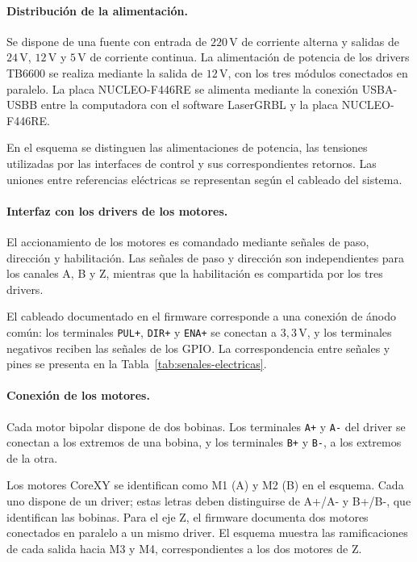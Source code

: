 \documentclass[blue,fullpaper]{ludusofficial}  %
\begin{document}
\paragraph{Distribución de la alimentación.}
Se dispone de una fuente con entrada de
$220\,\mathrm{V}$ de corriente alterna y salidas de
$24\,\mathrm{V}$, $12\,\mathrm{V}$ y $5\,\mathrm{V}$ de corriente continua.
La alimentación de potencia de los drivers TB6600
se realiza mediante la salida de $12\,\mathrm{V}$,
con los tres módulos conectados en paralelo.
La placa NUCLEO-F446RE se alimenta mediante
la conexión USBA-USBB entre la computadora con el software LaserGRBL y la placa NUCLEO-F446RE.

En el esquema se distinguen las alimentaciones
de potencia, las tensiones utilizadas por las
interfaces de control y sus correspondientes retornos.
Las uniones entre referencias eléctricas se representan
según el cableado del sistema.

\paragraph{Interfaz con los drivers de los motores.}
El accionamiento de los motores es comandado mediante
señales de paso, dirección y habilitación.
Las señales de paso y dirección son independientes
para los canales A, B y Z, mientras que la habilitación
es compartida por los tres drivers.

El cableado documentado en el firmware corresponde
a una conexión de ánodo común: los terminales
\texttt{PUL+}, \texttt{DIR+} y \texttt{ENA+}
se conectan a $3{,}3\,\mathrm{V}$, y los terminales
negativos reciben las señales de los GPIO.
La correspondencia entre señales y pines se presenta en la Tabla~\ref{tab:senales-electricas}.



\paragraph{Conexión de los motores.}
Cada motor bipolar dispone de dos bobinas.
Los terminales \texttt{A+} y \texttt{A-} del driver
se conectan a los extremos de una bobina,
y los terminales \texttt{B+} y \texttt{B-},
a los extremos de la otra.

Los motores CoreXY se identifican como M1 (A) y M2 (B) en el esquema. Cada uno dispone de un driver; estas letras deben distinguirse de A+/A- y B+/B-, que identifican las bobinas. Para el eje Z,
el firmware documenta dos motores conectados
en paralelo a un mismo driver. El esquema muestra las ramificaciones de cada salida hacia M3 y M4, correspondientes a los dos motores de Z.
\end{document}
